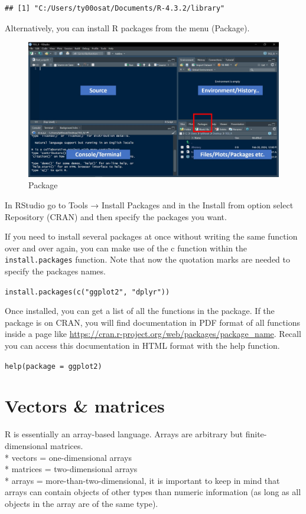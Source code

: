\documentclass[
]{book}
\begin{document}
\begin{verbatim}
## [1] "C:/Users/ty00osat/Documents/R-4.3.2/library"
\end{verbatim}

Alternatively, you can install R packages from the menu (Package).

\begin{figure}

{\centering \includegraphics[width=0.7\linewidth]{pictures/Package panel} 

}

\caption{Package}\label{fig:unnamed-chunk-25}
\end{figure}

In RStudio go to Tools → Install Packages and in the Install from option select Repository (CRAN) and then specify the packages you want.

If you need to install several packages at once without writing the same function over and over again, you can make use of the c function within the \texttt{install.packages} function. Note that now the quotation marks are needed to specify the packages names.

\texttt{install.packages(c("ggplot2",\ "dplyr"))}

Once installed, you can get a list of all the functions in the package. If the package is on CRAN, you will find documentation in PDF format of all functions inside a page like \url{https://cran.r-project.org/web/packages/package_name}. Recall you can access this documentation in HTML format with the help function.

\texttt{help(package\ =\ ggplot2)}

\hypertarget{vectors-matrices}{%
\chapter{Vectors \& matrices}\label{vectors-matrices}}

R is essentially an array-based language. Arrays are arbitrary but finite-dimensional matrices.\\
* vectors = one-dimensional arrays\\
* matrices = two-dimensional arrays\\
* arrays = more-than-two-dimensional, it is important to keep in mind that arrays can contain objects of other types than numeric information (as long as all objects in the array are of the same type).
\end{document}
